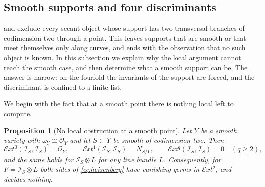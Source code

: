 \documentclass[11pt,reqno]{amsart}
\theoremstyle{plain}
\newtheorem{proposition}[theorem]{Proposition}
\theoremstyle{definition}
\theoremstyle{remark}
\newcommand{\cE}{\mathcal{E}}
\newcommand{\cO}{\mathcal{O}}
\newcommand{\cI}{\mathcal{I}}
\begin{document}
\subsection{Smooth supports and four discriminants}
\label{ssec:smoothsupport}

 and  exclude every secant
object whose support has two transversal branches of codimension two
through a point. This leaves supports that are smooth or that meet
themselves only along curves, and  ends with the
observation that no such object is known. In this subsection we explain why
the local argument cannot reach the smooth case, and then determine what a
smooth support can be. The answer is narrow: on the fourfold the invariants
of the support are forced, and the discriminant is confined to a finite list.

We begin with the fact that at a smooth point there is nothing local left to
compute.

\begin{proposition}[No local obstruction at a smooth point]\label{prop:smoothlocal}
Let $Y$ be a smooth variety with $\omega_{Y}\cong\cO_{Y}$ and let $S\subset Y$
be smooth of codimension two. Then
\[
  \cE xt^{0}(\cI_{S},\cI_{S})=\cO_{Y},\qquad
  \cE xt^{1}(\cI_{S},\cI_{S})=N_{S/Y},\qquad
  \cE xt^{q}(\cI_{S},\cI_{S})=0\quad(q\ge2),
\]
and the same holds for $\cI_{S}\otimes L$ for any line bundle $L$.
Consequently, for $F=\cI_{S}\otimes L$ both sides of \eqref{eq:heisenberg}
have vanishing germs in $\cE xt^{2}$, and  decides nothing.
\end{proposition}
\end{document}
